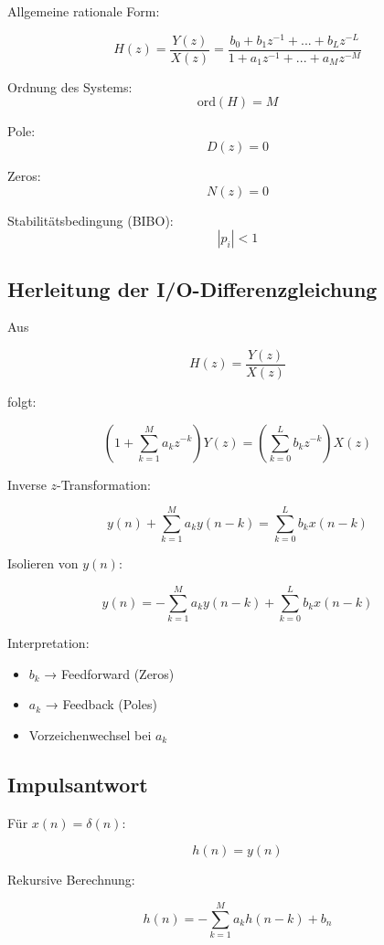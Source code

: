Allgemeine rationale Form:

\begin{equation}
H(z)=\frac{Y(z)}{X(z)}=
\frac{b_0+b_1z^{-1}+...+b_Lz^{-L}}
{1+a_1z^{-1}+...+a_Mz^{-M}}
\end{equation}

Ordnung des Systems:
\[
\text{ord}(H)=M
\]

Pole:
\[
D(z)=0
\]

Zeros:
\[
N(z)=0
\]

Stabilitätsbedingung (BIBO):
\[
|p_i|<1
\]

\subsection{Herleitung der I/O-Differenzgleichung}

Aus

\[
H(z)=\frac{Y(z)}{X(z)}
\]

folgt:

\[
\left(1+\sum_{k=1}^{M} a_k z^{-k}\right)Y(z)
=
\left(\sum_{k=0}^{L} b_k z^{-k}\right)X(z)
\]

Inverse $z$-Transformation:

\[
y(n)+\sum_{k=1}^{M} a_k y(n-k)
=
\sum_{k=0}^{L} b_k x(n-k)
\]

Isolieren von $y(n)$:

\begin{equation}
y(n)
=
-\sum_{k=1}^{M} a_k y(n-k)
+
\sum_{k=0}^{L} b_k x(n-k)
\end{equation}

Interpretation:

\begin{itemize}
\item $b_k$ → Feedforward (Zeros)
\item $a_k$ → Feedback (Poles)
\item Vorzeichenwechsel bei $a_k$
\end{itemize}

\subsection{Impulsantwort}

Für $x(n)=\delta(n)$:

\[
h(n)=y(n)
\]

Rekursive Berechnung:

\[
h(n)=
-\sum_{k=1}^{M} a_k h(n-k)
+
b_n
\]

